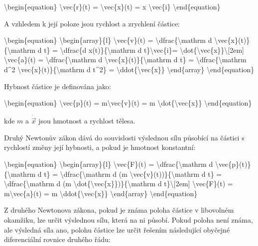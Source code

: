 \documentclass[letterpaper,10pt,english]{jupyterBook}
\begin{document}
\sphinxAtStartPar
\textbackslash{}begin\{equation\}
\textbackslash{}vec\{r\}(t) = \textbackslash{}vec\{x\}(t) = x \textbackslash{}vec\{i\}
\textbackslash{}end\{equation\}

\sphinxAtStartPar
A vzhledem k její poloze jsou rychlost a zrychlení částice:

\sphinxAtStartPar
\textbackslash{}begin\{equation\} \textbackslash{}begin\{array\}\{l\}
\textbackslash{}vec\{v\}(t) = \textbackslash{}dfrac\{\textbackslash{}mathrm d \textbackslash{}vec\{x\}(t)\}\{\textbackslash{}mathrm d t\} = \textbackslash{}dfrac\{d x(t)\}\{\textbackslash{}mathrm d t\}\textbackslash{}vec\{i\}= \textbackslash{}dot\{\textbackslash{}vec\{x\}\}\textbackslash{}{[}2em{]}
\textbackslash{}vec\{a\}(t) = \textbackslash{}dfrac\{\textbackslash{}mathrm d \textbackslash{}vec\{x\}(t)\}\{\textbackslash{}mathrm d t\} = \textbackslash{}dfrac\{\textbackslash{}mathrm d\textasciicircum{}2 \textbackslash{}vec\{x\}(t)\}\{\textbackslash{}mathrm d t\textasciicircum{}2\} = \textbackslash{}ddot\{\textbackslash{}vec\{x\}\}
\textbackslash{}end\{array\}
\textbackslash{}end\{equation\}

\sphinxAtStartPar
Hybnost částice je definována jako:

\sphinxAtStartPar
\textbackslash{}begin\{equation\}
\textbackslash{}vec\{p\}(t) = m\textbackslash{}vec\{v\}(t) = m \textbackslash{}dot\{\textbackslash{}vec\{x\}\}
\textbackslash{}end\{equation\}

\sphinxAtStartPar
kde \(m\) a \(\dot{\vec{x}}\) jsou hmotnost a rychlost tělesa.

\sphinxAtStartPar
Druhý Newtonův zákon dává do souvislosti výslednou sílu působící na částici s rychlostí změny její hybnosti, a pokud je hmotnost konstantní:

\sphinxAtStartPar
\textbackslash{}begin\{equation\} \textbackslash{}begin\{array\}\{l\}
\textbackslash{}vec\{F\}(t) = \textbackslash{}dfrac\{\textbackslash{}mathrm d \textbackslash{}vec\{p\}(t)\}\{\textbackslash{}mathrm d t\} = \textbackslash{}dfrac\{\textbackslash{}mathrm d (m \textbackslash{}vec\{v\}(t))\}\{\textbackslash{}mathrm d t\} =  \textbackslash{}dfrac\{\textbackslash{}mathrm d (m \textbackslash{}dot\{\textbackslash{}vec\{x\}\})\}\{\textbackslash{}mathrm d t\}\textbackslash{}{[}2em{]}
\textbackslash{}vec\{F\}(t) = m\textbackslash{}vec\{a\}(t) = m \textbackslash{}ddot\{\textbackslash{}vec\{x\}\}
\textbackslash{}end\{array\} \textbackslash{}end\{equation\}


\sphinxAtStartPar
Z druhého Newtonova zákona, pokud je známa poloha částice v libovolném okamžiku, lze určit výslednou sílu, která na ni působí. Pokud poloha není známa, ale výsledná síla ano, polohu částice lze určit řešením následující obyčejné diferenciální rovnice druhého řádu:
\end{document}
